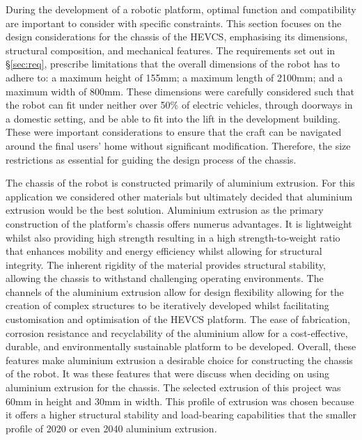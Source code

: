 \documentclass [12pt]{article}
\begin{document}
During the development of a robotic platform, optimal function and compatibility are important to consider with specific constraints. This section focuses on the design considerations for the chassis of the HEVCS, emphasising its dimensions, structural composition, and mechanical features.
The requirements set out in §\ref{sec:req}, prescribe limitations that the overall dimensions of the robot has to adhere to: a maximum height of 155mm; a maximum length of 2100mm; and a maximum width of 800mm. These dimensions were carefully considered such that the robot can fit under neither over 50\% of electric vehicles, through doorways in a domestic setting, and be able to fit into the lift in the development building. These were important considerations to ensure that the craft can be navigated around the final users’ home without significant modification. Therefore, the size restrictions as essential for guiding the design process of the chassis.

The chassis of the robot is constructed primarily of aluminium extrusion. For this application we considered other materials but ultimately decided that aluminium extrusion would be the best solution. Aluminium extrusion as the primary construction of the platform’s chassis offers numerus advantages. It is lightweight whilst also providing high strength resulting in a high strength-to-weight ratio that enhances mobility and energy efficiency whilst allowing for structural integrity.  The inherent rigidity of the material provides structural stability, allowing the chassis to withstand challenging operating environments. The channels of the aluminium extrusion allow for design flexibility allowing for the creation of complex structures to be iteratively developed whilst facilitating customisation and optimisation of the HEVCS platform.  The ease of fabrication, corrosion resistance and recyclability of the aluminium allow for a cost-effective, durable, and environmentally sustainable platform to be developed. Overall, these features make aluminium extrusion a desirable choice for constructing the chassis of the robot. It was these features that were discuss when deciding on using aluminium extrusion for the chassis. The selected extrusion of this project was 60mm in height and 30mm in width. This profile of extrusion was chosen because it offers a higher structural stability and load-bearing capabilities that the smaller profile of 2020 or even 2040 aluminium extrusion.
\end{document}
